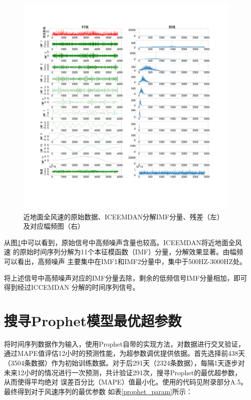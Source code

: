 \documentclass[AutoFakeBold]{LZUThesis}
\begin{document}
\begin{figure}[H]
    \centering
    \includegraphics[width=1\textwidth]{figures/wind.pdf}
    \caption{近地面全风速的原始数据、ICEEMDAN分解IMF分量、残差（左）及对应幅频图（右）}
    \label{fig_wind}
\end{figure}

从图\ref{fig_wind}中可以看到，原始信号中高频噪声含量也较高。ICEEMDAN将近地面全风速
的原始时间序列分解为11个本征模函数（IMF）分量，分解效果显著。由幅频可以看出，高频噪声
主要集中在IMF1和IMF2分量中，集中于500HZ-3000HZ处。

将上述信号中高频噪声对应的IMF分量去除，剩余的低频信号IMF分量相加，即可得到经过ICCEMDAN
分解的时间序列信号。

\section{搜寻Prophet模型最优超参数}
将时间序列数据作为输入，使用Prophet自带的实现方法，对数据进行交叉验证，
通过MAPE值评估12小时的预测性能，为超参数调优提供依据。首先选择前438天
（3504条数据）作为初始训练数据。对于后291天（2324条数据），每隔1天逐步对
未来12小时的情况进行一次预测，共计验证291次，搜寻Prophet的最优超参数，从而使得平均绝对
误差百分比（MAPE）值最小化。使用的代码见附录部分A.5。最终得到对于风速序列的最优参数
如表\ref{prophet_param}所示：
\end{document}
